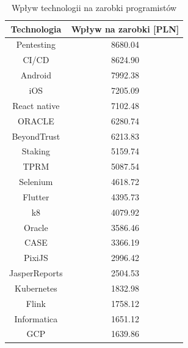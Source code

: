 \documentclass{article}
\begin{document}
\begin{table}[H]
    \centering
    \begin{tabular}{|c|c|}
        \hline
        \textbf{Technologia} & \textbf{Wpływ na zarobki [PLN]} \\ \hline
        Pentesting           & 8680.04                         \\ \hline
        CI/CD                & 8624.90                         \\ \hline
        Android              & 7992.38                         \\ \hline
        iOS                  & 7205.09                         \\ \hline
        React native         & 7102.48                         \\ \hline
        ORACLE               & 6280.74                         \\ \hline
        BeyondTrust          & 6213.83                         \\ \hline
        Staking              & 5159.74                         \\ \hline
        TPRM                 & 5087.54                         \\ \hline
        Selenium             & 4618.72                         \\ \hline
        Flutter              & 4395.73                         \\ \hline
        k8                   & 4079.92                         \\ \hline
        Oracle               & 3586.46                         \\ \hline
        CASE                 & 3366.19                         \\ \hline
        PixiJS               & 2996.42                         \\ \hline
        JasperReports        & 2504.53                         \\ \hline
        Kubernetes           & 1832.98                         \\ \hline
        Flink                & 1758.12                         \\ \hline
        Informatica          & 1651.12                         \\ \hline
        GCP                  & 1639.86                         \\ \hline
    \end{tabular}
    \caption{Wpływ technologii na zarobki programistów}
    \label{tab:technology}
\end{table}
\end{document}
